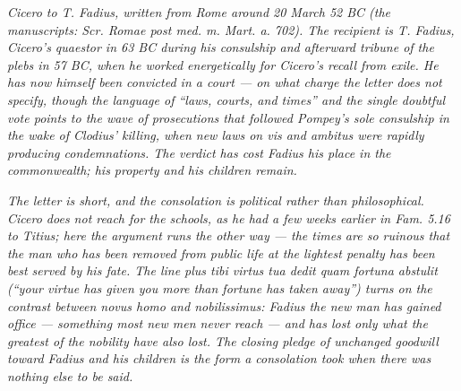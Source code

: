 
\textit{Cicero to T. Fadius, written from Rome around
20 March 52 BC (the manuscripts: \textit{Scr. Romae post
med. m. Mart. a. 702}). The recipient is T. Fadius,
Cicero's quaestor in 63 BC during his consulship and
afterward tribune of the plebs in 57 BC, when he worked
energetically for Cicero's recall from exile. He has now
himself been convicted in a court --- on what charge the
letter does not specify, though the language of
``laws, courts, and times'' and the single doubtful
vote points to the wave of prosecutions that followed
Pompey's sole consulship in the wake of Clodius'
killing, when new laws on \textit{vis} and
\textit{ambitus} were rapidly producing condemnations.
The verdict has cost Fadius his place in the
commonwealth; his property and his children remain.}

\textit{The letter is short, and the consolation is
political rather than philosophical. Cicero does not
reach for the schools, as he had a few weeks earlier in
\textit{Fam.} 5.16 to Titius; here the argument runs
the other way --- the times are so ruinous that the man
who has been removed from public life at the lightest
penalty has been best served by his fate. The line
\textit{plus tibi virtus tua dedit quam fortuna
abstulit} (``your virtue has given you more than
fortune has taken away'') turns on the contrast
between \textit{novus homo} and \textit{nobilissimus}:
Fadius the new man has gained office --- something most
new men never reach --- and has lost only what the
greatest of the nobility have also lost. The closing
pledge of unchanged goodwill toward Fadius and his
children is the form a consolation took when there was
nothing else to be said.}
